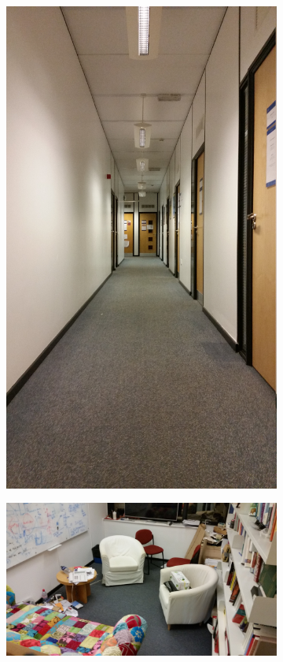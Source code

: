 \documentclass[a4paper,12pt,oneside,openright]{bhamthesis}
\begin{document}
\begin{figure}
		\centering
		\begin{subfigure}[b]{0.32\textwidth}
			\centering
			\includegraphics[width=\textwidth]{chapter5_fig/corridor.jpg}
			\caption{}
			\label{subfig:corridor_exp3}
		\end{subfigure}
		\hfill
		\begin{subfigure}[b]{0.65\textwidth}
			\centering
			\includegraphics[width=\textwidth]{chapter5_fig/office.jpg}

\end{subfigure}
\end{figure}
\end{document}
